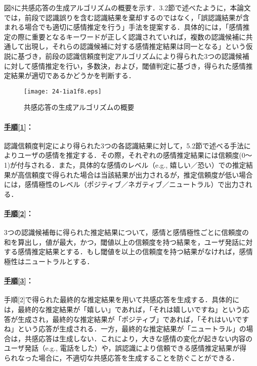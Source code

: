 \documentclass[japanese]{jnlp_1.4}
\begin{document}
図8に共感応答の生成アルゴリズムの概要を示す．3.2節で述べたように，本論文では，前段で認識誤りを含む認識結果を棄却するのではなく，「誤認識結果が含まれる場合でも適切に感情推定を行う」手法を提案する．具体的には，「感情推定の際に重要となるキーワードが正しく認識されていれば，複数の認識候補に共通して出現し，それらの認識候補に対する感情推定結果は同一となる」という仮説に基づき，前段の認識信頼度判定アルゴリズムにより得られた3つの認識候補に対して感情推定を行い，多数決，および，閾値判定に基づき，得られた感情推定結果が適切であるかどうかを判断する．

\begin{figure}[b]
\begin{center}
\texttt{[image: 24-1ia1f8.eps]}
\end{center}
\caption{共感応答の生成アルゴリズムの概要}
\label{fig:8}
\end{figure}


\paragraph{\underline{手順[1]}：}認識信頼度判定により得られた3つの各認識結果に対して，5.2節で述べる手法によりユーザの感情を推定する．その際，それぞれの感情推定結果には信頼度(0〜1)が付与される．また，具体的な感情のレベル（e.g., 嬉しい／恐い）での推定結果が高信頼度で得られた場合は当該結果が出力されるが，推定信頼度が低い場合には，感情極性のレベル（ポジティブ／ネガティブ／ニュートラル）で出力される．


\paragraph{\underline{手順[2]}：}3つの認識候補毎に得られた推定結果について，感情と感情極性ごとに信頼度の和を算出し，値が最大，かつ，閾値以上の信頼度を持つ結果を，ユーザ発話に対する感情推定結果とする．もし閾値を以上の信頼度を持つ結果がなければ，感情極性はニュートラルとする．


\paragraph{\underline{手順[3]}：}手順[2]で得られた最終的な推定結果を用いて共感応答を生成する．具体的には，最終的な推定結果が「嬉しい」であれば，「それは嬉しいですね」という応答が生成され，最終的な推定結果が「ポジティブ」であれば，「それはいいですね」という応答が生成される．一方，最終的な推定結果が「ニュートラル」の場合は，共感応答は生成しない．これにより，大きな感情の変化が起きない内容のユーザ発話（e.g., 電話をした）や，誤認識により信頼できる感情推定結果が得られなった場合に，不適切な共感応答を生成することを防ぐことができる．
\end{document}
